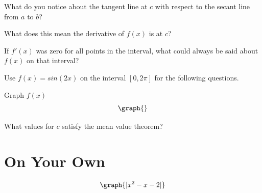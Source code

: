 \documentclass{ximera}
\begin{document}
\begin{question}
What do you notice about the tangent line at $c$ with respect to the secant line from $a$ to $b$?

\begin{multipleChoice}
\end{multipleChoice}

What does this mean the derivative of $f(x)$ is at $c$?

\begin{multipleChoice}
\end{multipleChoice}

If $f'(x)$ was zero for all points in the interval, what could always be said about $f(x)$ on that interval?
\begin{multipleChoice}
\end{multipleChoice}

\end{question}
\begin{question}
Use $f(x)=sin(2x)$ on the interval $[0,2\pi]$ for the following questions.

Graph $f(x)$
\[
\graph{}
\]

What values for $c$ satisfy the mean value theorem?

\begin{selectAll}
\choice{$\pi$}
\end{selectAll}

\end{question}

\section{On Your Own}

\[
\graph{|x^2-x-2|}
\]
\end{document}
